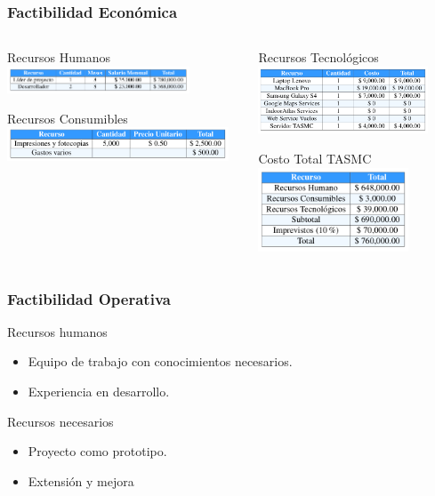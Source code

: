 \documentclass[12pt]{beamer}
\begin{document}
\begin{frame}
	\frametitle{Factibilidad Económica}
	\begin{columns} 
		\begin{column}{5cm}
			\begin{block}{Recursos Humanos}
				\includegraphics[height=0.8cm]{imagenes/rh.png}
			\end{block}
			\begin{block}{Recursos Consumibles}
				\includegraphics[height=1cm]{imagenes/rc.png}
			\end{block}
		\end{column}
		\begin{column}{5cm} 
			\begin{block}{Recursos Tecnológicos}
				\includegraphics[height=2cm]{imagenes/rt.png}
			\end{block}
			\begin{block}{Costo Total TASMC}
				\includegraphics[height=2.5cm]{imagenes/ct.png}
			\end{block}
		\end{column} 
	\end{columns}
\end{frame}


\begin{frame}
		\frametitle{Factibilidad Operativa}
		\begin{block}{Recursos humanos}
			\begin{itemize}
			\item Equipo de trabajo con conocimientos necesarios.
			\item Experiencia en desarrollo.
			\end{itemize}
		\end{block}
		\begin{block}{Recursos necesarios}
			\begin{itemize}
			\item Proyecto como prototipo.
			\item Extensión y mejora
			\end{itemize}
		\end{block}
\end{frame}
\end{document}
